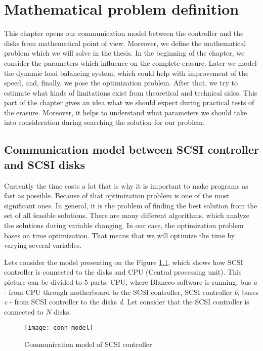 \chapter{Mathematical problem definition}
\label{chap3:title}

This chapter opens our communication model between the controller and the disks from mathematical point of view. Moreover, we define the mathematical problem which we will solve in the thesis. In the beginning of the chapter, we consider the parameters which influence on the complete erasure. Later we model the dynamic load balancing system, which could help with improvement of the speed, and, finally, we pose the optimization problem. After that, we try to estimate what kinds of limitations exist from theoretical and technical sides. This part of the chapter gives an idea what we should expect during practical tests of the erasure. Moreover, it helps to understand what parameters we should take into consideration during searching the solution for our problem.

\newpage
\section{Communication model between SCSI controller and SCSI disks}
Currently the time costs a lot that is why it is important to make programs as fast as possible. Because of that optimization problem is one of the most significant ones. In general, it is the problem of finding the best solution from the set of all feasible solutions. There are many different algorithms, which analyze the solutions during variable changing. In our case, the optimization problem bases on time optimization. That means that we will optimize the time by varying several variables.

Lets consider the model presenting on the Figure \ref{fig:conn_model}, which shows how SCSI controller is connected to the disks and CPU (Central processing unit). This picture can be divided to 5 parts: CPU, where Blancco software is running, bus \emph{a} - from CPU through motherboard to the SCSI controller, SCSI controller \emph{b}, buses \emph{c} - from SCSI controller to the disks \emph{d}. Let consider that the SCSI controller is connected to $N$ disks.

\begin{figure}[h]
\begin{center}
  \texttt{[image: conn\_model]}
\end{center}
  \caption{Communication model of SCSI controller}
  \label{fig:conn_model}
\end{figure}

